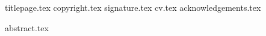 


\frontmatter
{titlepage.tex}
{copyright.tex}
{signature.tex}
{cv.tex}
{acknowledgements.tex}
\tableofcontents
\listoffigures
\listoftables

{abstract.tex}

\mainmatter






\printbibliography[heading=bibintoc]



